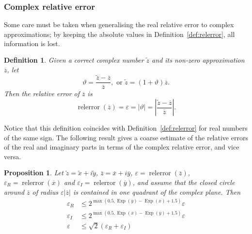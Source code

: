 \documentclass {article}
\newcommand {\corr}[1]{\widetilde {#1}}
\newcommand {\appro}[1]{\overline {#1}}
\DeclareMathOperator{\Exp}{\operatorname {Exp}}
\newcommand{\relerror}{\operatorname {relerror}}
\renewcommand {\epsilon}{\varepsilon}
\renewcommand {\theta}{\vartheta}
\renewcommand {\leq}{\leqslant}
\newtheorem{definition}[theorem]{Definition}
\newtheorem{prop}[theorem]{Proposition}
\begin{document}
\subsubsection {Complex relative error}
\label {sssec:comrelerror}

Some care must be taken when generalising the real relative error to complex
approximations; by keeping the absolute values in
Definition~\ref {def:relerror}, all information is lost.

\begin {definition}
\label {def:comrelerror}
Given a correct complex number $\corr z$ and its non-zero approximation
$\appro z$, let
\[
\theta = \frac {\corr z - \appro z}{\appro z},
\text { or }
\corr z = (1 + \theta) \appro z.
\]
Then the {\em relative error} of $\appro z$ is
\[
\relerror (\appro z) = \epsilon = | \theta |
= \left| \frac {\corr z - \appro z}{\appro z} \right|.
\]
\end {definition}

Notice that this definition coincides with Definition~\ref {def:relerror}
for real numbers of the same sign. The following result gives a coarse
estimate of the relative errors of the real and imaginary parts in terms of
the complex relative error, and vice versa.

\begin {prop}
\label {prop:comrelerror}
Let $\corr z = \corr x + i \corr y$, $\appro z = \appro x + i \appro y$,
$\epsilon = \relerror (\appro z)$,
$\epsilon_R = \relerror (\appro x)$ and
$\epsilon_I = \relerror (\appro y)$,
and assume that the closed circle around $\appro z$ of radius
$\epsilon |\appro z|$ is contained in one quadrant of the complex plane. Then
\begin {align*}
\epsilon_R
&\leq 2^{\max (0.5, \Exp (\appro y) - \Exp (\appro x) + 1.5)} \epsilon \\
\epsilon_I
&\leq 2^{\max (0.5, \Exp (\appro x) - \Exp (\appro y) + 1.5)} \epsilon \\
\epsilon
&\leq \sqrt 2 (\epsilon_R + \epsilon_I)
\end {align*}
\end {prop}
\end{document}
